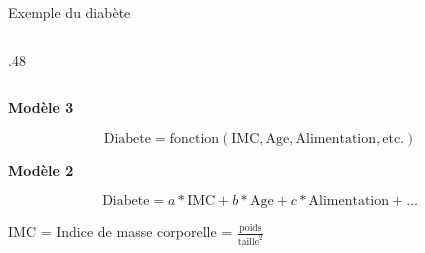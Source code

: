 \begin{frame}{Exemple du diabète}
\begin{overprint}
\begin{columns}
\begin{column}{.48\textwidth}
{        }
      \end{column}
    \end{columns}

      \bigskip
      \textbf{Modèle 3}

      $$
        \mbox{Diabete} = \mbox{fonction}(\mbox{IMC}, \mbox{Age}, \mbox{Alimentation}, \mbox{etc.})
      $$

      \bigskip
      \textbf{Modèle 2}

      $$
        \mbox{Diabete} = a * \mbox{IMC} + b * \mbox{Age} + c * \mbox{Alimentation} + \dots
      $$
    \end{overprint}

    {\footnotesize IMC = Indice de masse corporelle = $\frac{\text{poids}}{\text{taille}^2}$}


\end{frame}

